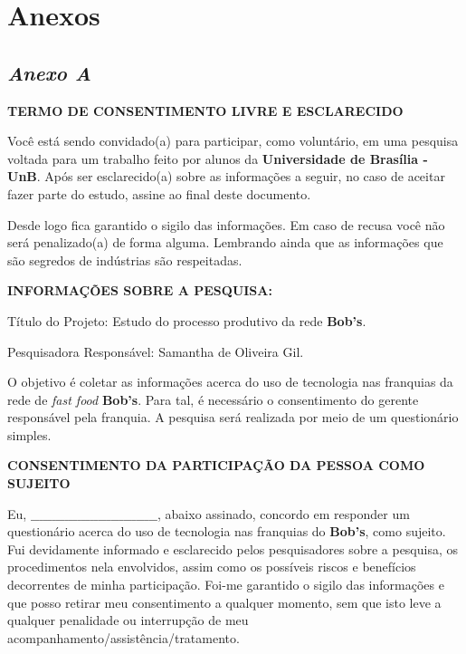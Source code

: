 \chapter[Anexos]{Anexos}
\label{chap:anexos}

	\section[Anexo A]{\emph{Anexo A}}
	\label{sec:anexoA}

		\begin{center}
			\textbf{TERMO DE CONSENTIMENTO LIVRE E ESCLARECIDO}
		\end{center}

		Você está sendo convidado(a) para participar, como voluntário, em uma pesquisa voltada para um trabalho feito por alunos da \textbf{Universidade de Brasília - UnB}. Após ser esclarecido(a) sobre as informações a seguir, no caso de aceitar fazer parte do estudo, assine ao final deste documento.
		
		Desde logo fica garantido o sigilo das informações. Em caso de recusa você não será penalizado(a) de forma alguma. Lembrando ainda que as informações que são segredos de indústrias são respeitadas.

		\begin{center}
			\textbf{INFORMAÇÕES SOBRE A PESQUISA:}
		\end{center}
		
		\begin{flushleft}
			Título do Projeto: Estudo do processo produtivo da rede \textbf{Bob’s}.
			
			Pesquisadora Responsável: Samantha de Oliveira Gil.
		\end{flushleft}

		O objetivo é coletar as informações acerca do uso de tecnologia nas franquias da rede de \emph{fast food} \textbf{Bob’s}. Para tal, é necessário o consentimento do gerente responsável pela franquia. A pesquisa será realizada por meio de um questionário simples.

		\begin{center}
			\textbf{CONSENTIMENTO DA PARTICIPAÇÃO DA PESSOA COMO SUJEITO}
		\end{center}

		Eu, $\_\_\_\_\_\_\_\_\_\_\_\_\_\_\_\_\_\_\_\_\_\_\_\_\_\_\_\_\_\_$, abaixo assinado, concordo em responder um questionário acerca do uso de tecnologia nas franquias do \textbf{Bob’s}, como sujeito. Fui devidamente informado e esclarecido pelos pesquisadores sobre a pesquisa, os procedimentos nela envolvidos, assim como os possíveis riscos e benefícios decorrentes de minha participação. Foi-me garantido o sigilo das informações e que posso retirar meu consentimento a qualquer momento, sem que isto leve a qualquer penalidade ou interrupção de meu acompanhamento/assistência/tratamento. 

